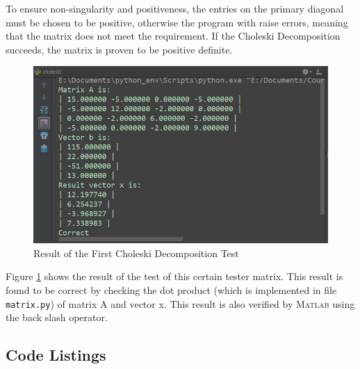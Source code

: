 \documentclass[a4paper,titlepage]{article}
\newcommand{\MATLAB}{\textsc{Matlab}\xspace}
\begin{document}
			To ensure non-singularity and positiveness, the entries on the primary diagonal must be chosen to be positive, otherwise the program with raise errors, meaning that the matrix does not meet the requirement. If the Choleski Decomposition succeeds, the matrix is proven to be positive definite.
			\begin{figure}[!h]
				\centering
				\includegraphics[width=\linewidth]{chol_1_result}
				\caption{Result of the First Choleski Decomposition Test}
				\label{chol_1_result}
			\end{figure}
		
			Figure \ref{chol_1_result} shows the result of the test of this certain tester matrix. This result is found to be correct by checking the dot product (which is implemented in file \texttt{matrix.py}) of matrix A and vector x. This result is also verified by \MATLAB using the back slash operator.
	
	\onecolumn
	\begin{appendices}
		
		\section{Code Listings} \label{appendix:code}
		
		
		\begin{center}
			\inputminted{python}{../matrix.py}
			\label{lst:matrices}
		\end{center}
		
		\begin{center}
			\inputminted{python}{../choleski.py}
			\label{lst:choleski}
		\end{center}
		
		\begin{center}
			\inputminted{python}{../linearNetwork.py}
			\label{lst:linear_networks}
		\end{center}
		
	\end{appendices}
	
\end{document}
